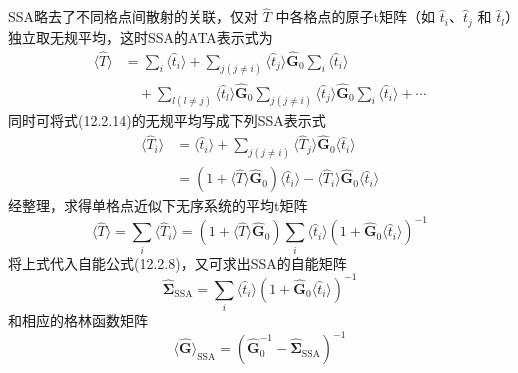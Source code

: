 SSA略去了不同格点间散射的关联，仅对 $\hat{T}$ 中各格点的原子t矩阵（如 $\hat{t}_{i}$、$\hat{t}_{j}$ 和 $\hat{t}_{l}$）独立取无规平均，这时SSA的ATA表示式为
\begin{equation}
\begin{aligned}
  \langle\hat{T}\rangle&=\sum_{i}\langle\hat{t}_{i}\rangle
  +\sum_{j(j\neq i)}\langle\hat{t}_{j}\rangle\hat{\boldsymbol{G}}_{0}\sum_{i}\langle\hat{t}_{i}\rangle\\
  &\quad+\sum_{l(l\neq j)}\langle\hat{t}_{l}\rangle\hat{\boldsymbol{G}}_{0}\sum_{j(j\neq i)}\langle\hat{t}_{j}\rangle
  \hat{\boldsymbol{G}}_{0}\sum_{i}\langle\hat{t}_{i}\rangle+\cdots
\end{aligned}
\end{equation}
同时可将式(12.2.14)的无规平均写成下列SSA表示式
\begin{equation}
\begin{aligned}
  \langle\hat{T}_{i}\rangle&=\langle\hat{t}_{i}\rangle
  +\sum_{j(j\neq i)}\langle\hat{T}_{j}\rangle\hat{\boldsymbol{G}}_{0}\langle\hat{t}_{i}\rangle\\
  &=\left(1+\langle\hat{T}\rangle\hat{\boldsymbol{G}}_{0}\right)\langle\hat{t}_{i}\rangle
  -\langle\hat{T}_{i}\rangle\hat{\boldsymbol{G}}_{0}\langle\hat{t}_{i}\rangle
\end{aligned}
\end{equation}
经整理，求得单格点近似下无序系统的平均t矩阵
\begin{equation}
  \langle\hat{T}\rangle=\sum_{i}\langle\hat{T}_{i}\rangle
  =\left(1+\langle\hat{T}\rangle\hat{\boldsymbol{G}}_{0}\right)\sum_{i}\langle\hat{t}_{i}\rangle
  \left(1+\hat{\boldsymbol{G}}_{0}\langle\hat{t}_{i}\rangle\right)^{-1}
\end{equation}
将上式代入自能公式(12.2.8)，又可求出SSA的自能矩阵
\begin{equation}
  \hat{\boldsymbol{\Sigma}}_{\mathrm{SSA}}=\sum_{i}\langle\hat{t}_{i}\rangle
  \left(1+\hat{\boldsymbol{G}}_{0}\langle\hat{t}_{i}\rangle\right)^{-1}
\end{equation}
和相应的格林函数矩阵
\begin{equation}
  \langle\hat{\boldsymbol{G}}\rangle_{\mathrm{SSA}}
  =\left(\hat{\boldsymbol{G}}_{0}^{-1}-\hat{\boldsymbol{\Sigma}}_{\mathrm{SSA}}\right)^{-1}
\end{equation}

